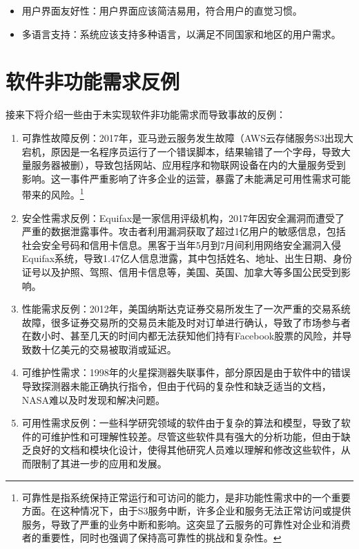 \documentclass[11pt, a4paper, oneside]{ctexbook}
\begin{document}
\begin{enumerate}[itemsep=10pt,parsep=0pt,partopsep=0pt,topsep=0pt]
    \begin{itemize}[itemsep=0pt,parsep=0pt,partopsep=0pt,topsep=0pt]
        \item 用户界面友好性：用户界面应该简洁易用，符合用户的直觉习惯。
        \item 多语言支持：系统应该支持多种语言，以满足不同国家和地区的用户需求。
    \end{itemize}
\end{enumerate}

\chapter{软件非功能需求反例}
接来下将介绍一些由于未实现软件非功能需求而导致事故的反例：
\begin{enumerate}
    \item 可靠性故障反例：2017年，亚马逊云服务发生故障（AWS云存储服务S3出现大宕机，原因是一名程序员运行了一个错误脚本，结果输错了一个字母，导致大量服务器被删），导致包括网站、应用程序和物联网设备在内的大量服务受到影响。这一事件严重影响了许多企业的运营，暴露了未能满足可用性需求可能带来的风险。\footnote{可靠性是指系统保持正常运行和可访问的能力，是非功能性需求中的一个重要方面。在这种情况下，由于S3服务中断，许多企业和服务无法正常访问或提供服务，导致了严重的业务中断和影响。这突显了云服务的可靠性对企业和消费者的重要性，同时也强调了保持高可靠性的挑战和复杂性。}
    \item 安全性需求反例：Equifax是一家信用评级机构，2017年因安全漏洞而遭受了严重的数据泄露事件。攻击者利用漏洞获取了超过1亿用户的敏感信息，包括社会安全号码和信用卡信息。黑客于当年5月到7月间利用网络安全漏洞入侵Equifax系统，导致1.47亿人信息泄露，其中包括姓名、地址、出生日期、身份证号以及护照、驾照、信用卡信息等，美国、英国、加拿大等多国公民受到影响。
    \item 性能需求反例：2012年，美国纳斯达克证券交易所发生了一次严重的交易系统故障，很多证券交易所的交易员未能及时对订单进行确认，导致了市场参与者在数小时、甚至几天的时间内都无法获知他们持有Facebook股票的风险，并导致数十亿美元的交易被取消或延迟。
    \item 可维护性需求：1998年的火星探测器失联事件，部分原因是由于软件中的错误导致探测器未能正确执行指令，但由于代码的复杂性和缺乏适当的文档，NASA难以及时发现和解决问题。
    \item 可用性需求反例：一些科学研究领域的软件由于复杂的算法和模型，导致了软件的可维护性和可理解性较差。尽管这些软件具有强大的分析功能，但由于缺乏良好的文档和模块化设计，使得其他研究人员难以理解和修改这些软件，从而限制了其进一步的应用和发展。
\end{enumerate}
\end{document}

